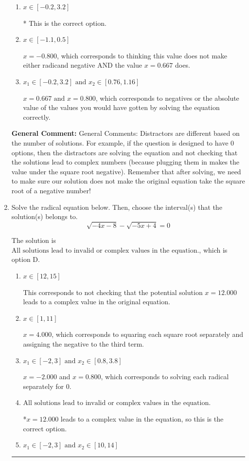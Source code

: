 \documentclass{extbook}[14pt]
\newcommand{\litem}[1]{\item #1

\rule{\textwidth}{0.4pt}}
\begin{document}
\begin{enumerate}
{\begin{enumerate}[label=\Alph*.]
This corresponds to believing both $x = -0.800 \text{ and } x = 0.667$ both lead to complex values.
\item \( x \in [-0.2,3.2] \)

* This is the correct option.
\item \( x \in [-1.1,0.5] \)

$x = -0.800$, which corresponds to thinking this value does not make either radicand negative AND the value $x = 0.667$ does.
\item \( x_1 \in [-0.2, 3.2] \text{ and } x_2 \in [0.76,1.16] \)

$x = 0.667 \text{ and } x = 0.800$, which corresponds to negatives or the absolute value of the values you would have gotten by solving the equation correctly.
\end{enumerate}

\textbf{General Comment:} General Comments: Distractors are different based on the number of solutions. For example, if the question is designed to have 0 options, then the distractors are solving the equation and not checking that the solutions lead to complex numbers (because plugging them in makes the value under the square root negative). Remember that after solving, we need to make sure our solution does not make the original equation take the square root of a negative number!
}
\litem{
Solve the radical equation below. Then, choose the interval(s) that the solution(s) belongs to.
\[ \sqrt{-4 x - 8} - \sqrt{-5 x + 4} = 0 \]

The solution is \( \text{All solutions lead to invalid or complex values in the equation.} \), which is option D.\begin{enumerate}[label=\Alph*.]
\item \( x \in [12,15] \)

This corresponds to not checking that the potential solution $x = 12.000$ leads to a complex value in the original equation.
\item \( x \in [1,11] \)

$x = 4.000$, which corresponds to squaring each square root separately and assigning the negative to the third term.
\item \( x_1 \in [-2, 3] \text{ and } x_2 \in [0.8,3.8] \)

$x = -2.000$ and $x = 0.800$, which corresponds to solving each radical separately for 0.
\item \( \text{All solutions lead to invalid or complex values in the equation.} \)

*$x = 12.000$ leads to a complex value in the equation, so this is the correct option.
\item \( x_1 \in [-2, 3] \text{ and } x_2 \in [10,14] \)


\end{enumerate}}
\end{enumerate}
\end{document}
